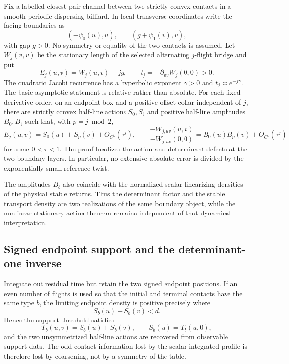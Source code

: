 Fix a labelled closest-pair channel between two strictly convex contacts in a
smooth periodic dispersing billiard.  In local transverse coordinates write
the facing boundaries as
\[
 (-\psi_0(u),u),\qquad (g+\psi_1(v),v),
\]
with gap $g>0$.  No symmetry or equality of the two contacts is assumed.  Let
$W_j(u,v)$ be the stationary length of the selected alternating $j$-flight
bridge and put
\[
 E_j(u,v)=W_j(u,v)-jg,
 \qquad
 t_j=-\partial_{uv}W_j(0,0)>0.
\]
The quadratic Jacobi recurrence has a hyperbolic exponent $\gamma>0$ and
$t_j\asymp e^{-j\gamma}$.  The basic asymptotic statement is relative rather
than absolute.  For each fixed derivative order, on an endpoint box and a
positive offset collar independent of $j$, there are strictly convex
half-line actions $S_0,S_1$ and positive half-line amplitudes $B_0,B_1$ such
that, with $p=j\bmod2$,
\begin{equation}\label{eq:intro-v22-relative}
 E_j(u,v)=S_0(u)+S_p(v)+O_{C^k}(\tau^j),
 \qquad
 \frac{-W_{j,uv}(u,v)}{-W_{j,uv}(0,0)}
 =B_0(u)B_p(v)+O_{C^k}(\tau^j)
\end{equation}
for some $0<\tau<1$.  The proof localizes the action and determinant defects
at the two boundary layers.  In particular, no extensive absolute error is
divided by the exponentially small reference twist.

The amplitudes $B_b$ also coincide with the normalized scalar linearizing
densities of the physical stable returns.  Thus the determinant factor and
the stable transport density are two realizations of the same boundary
object, while the nonlinear stationary-action theorem remains independent of
that dynamical interpretation.

\subsection{Signed endpoint support and the determinant-one inverse}

Integrate out residual time but retain the two signed endpoint positions.  If
an even number of flights is used so that the initial and terminal contacts
have the same type $b$, the limiting endpoint density is positive precisely
where
\begin{equation}\label{eq:intro-v22-support}
                         S_b(u)+S_b(v)<d.
\end{equation}
Hence the support threshold satisfies
\[
 T_b(u,v)=S_b(u)+S_b(v),\qquad S_b(u)=T_b(u,0),
\]
and the two unsymmetrized half-line actions are recovered from observable
support data.  The odd contact information lost by the scalar integrated
profile is therefore lost by coarsening, not by a symmetry of the table.


